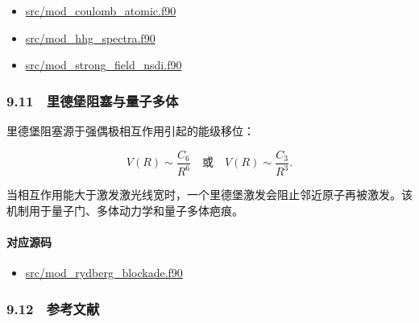 \documentclass[
]{ctexbook}
\providecommand{\tightlist}{%
  \setlength{\itemsep}{0pt}\setlength{\parskip}{0pt}}
\begin{document}
\begin{itemize}
\tightlist
\item
  \href{https://github.com/l1Ha/QuantumGeneralModule/blob/main/src/mod_coulomb_atomic.f90}{src/mod\_coulomb\_atomic.f90}
\item
  \href{https://github.com/l1Ha/QuantumGeneralModule/blob/main/src/mod_hhg_spectra.f90}{src/mod\_hhg\_spectra.f90}
\item
  \href{https://github.com/l1Ha/QuantumGeneralModule/blob/main/src/mod_strong_field_nsdi.f90}{src/mod\_strong\_field\_nsdi.f90}
\end{itemize}

\hypertarget{ux91ccux5fb7ux5821ux963bux585eux4e0eux91cfux5b50ux591aux4f53}{%
\subsubsection{9.11　里德堡阻塞与量子多体}\label{ux91ccux5fb7ux5821ux963bux585eux4e0eux91cfux5b50ux591aux4f53}}

里德堡阻塞源于强偶极相互作用引起的能级移位：

\[
V(R)\sim\frac{C_6}{R^6}
\quad\text{或}\quad
V(R)\sim\frac{C_3}{R^3}.
\]

当相互作用能大于激发激光线宽时，一个里德堡激发会阻止邻近原子再被激发。该机制用于量子门、多体动力学和量子多体疤痕。

\hypertarget{ux5bf9ux5e94ux6e90ux7801-49}{%
\paragraph{对应源码}\label{ux5bf9ux5e94ux6e90ux7801-49}}

\begin{itemize}
\tightlist
\item
  \href{https://github.com/l1Ha/QuantumGeneralModule/blob/main/src/mod_rydberg_blockade.f90}{src/mod\_rydberg\_blockade.f90}
\end{itemize}

\hypertarget{ux53c2ux8003ux6587ux732e-4}{%
\subsubsection{9.12　参考文献}\label{ux53c2ux8003ux6587ux732e-4}}
\end{document}
